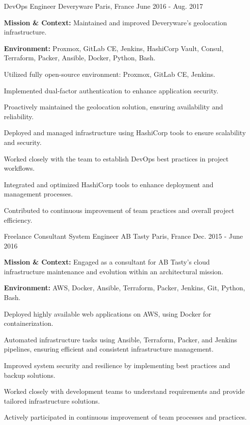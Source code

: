 \begin{cventries}
\cventry
{DevOps Engineer} %
{Deveryware} %
{Paris, France} %
{June 2016 - Aug. 2017} %
{
  \begin{cvitems} %
    \item {\textbf{Mission \& Context:} Maintained and improved Deveryware's geolocation infrastructure.}
    \item {\textbf{Environment:} Proxmox, GitLab CE, Jenkins, HashiCorp Vault, Consul, Terraform, Packer, Ansible, Docker, Python, Bash.}
    \item {Utilized fully open-source environment: Proxmox, GitLab CE, Jenkins.}
    \item {Implemented dual-factor authentication to enhance application security.}
    \item {Proactively maintained the geolocation solution, ensuring availability and reliability.}
    \item {Deployed and managed infrastructure using HashiCorp tools to ensure scalability and security.}
    \item {Worked closely with the team to establish DevOps best practices in project workflows.}
    \item {Integrated and optimized HashiCorp tools to enhance deployment and management processes.}
    \item {Contributed to continuous improvement of team practices and overall project efficiency.}
  \end{cvitems}
}

\cventry
{Freelance Consultant System Engineer} %
{AB Tasty} %
{Paris, France} %
{Dec. 2015 - June 2016} %
{
  \begin{cvitems} %
    \item {\textbf{Mission \& Context:} Engaged as a consultant for AB Tasty's cloud infrastructure maintenance and evolution within an architectural mission.}
    \item {\textbf{Environment:} AWS, Docker, Ansible, Terraform, Packer, Jenkins, Git, Python, Bash.}
    \item {Deployed highly available web applications on AWS, using Docker for containerization.}
    \item {Automated infrastructure tasks using Ansible, Terraform, Packer, and Jenkins pipelines, ensuring efficient and consistent infrastructure management.}
    \item {Improved system security and resilience by implementing best practices and backup solutions.}
    \item {Worked closely with development teams to understand requirements and provide tailored infrastructure solutions.}
    \item {Actively participated in continuous improvement of team processes and practices.}
  \end{cvitems}
}


\end{cventries}
